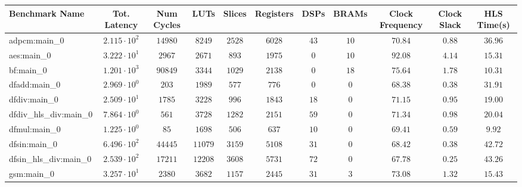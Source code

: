 \begin{tabular}{|l|c|c|c|c|c|c|c|c|c|c|}
\hline
Benchmark Name          & Tot. Latency           & Num Cycles & LUTs      & Slices    & Registers & DSPs    & BRAMs   & Clock Frequency & Clock Slack & HLS Time(s) \\
\hline
adpcm:main\_0           & $ 2.115 \cdot 10^{2} $ & $ 14980  $ & $ 8249  $ & $ 2528  $ & $ 6028  $ & $ 43  $ & $ 10  $ & $ 70.84       $ & $ 0.88    $ & $ 36.96   $ \\
aes:main\_0             & $ 3.222 \cdot 10^{1} $ & $ 2967   $ & $ 2671  $ & $ 893   $ & $ 1975  $ & $ 0   $ & $ 10  $ & $ 92.08       $ & $ 4.14    $ & $ 15.31   $ \\
bf:main\_0              & $ 1.201 \cdot 10^{3} $ & $ 90849  $ & $ 3344  $ & $ 1029  $ & $ 2138  $ & $ 0   $ & $ 18  $ & $ 75.64       $ & $ 1.78    $ & $ 10.31   $ \\
dfadd:main\_0           & $ 2.969 \cdot 10^{0} $ & $ 203    $ & $ 1989  $ & $ 577   $ & $ 776   $ & $ 0   $ & $ 0   $ & $ 68.38       $ & $ 0.38    $ & $ 31.91   $ \\
dfdiv:main\_0           & $ 2.509 \cdot 10^{1} $ & $ 1785   $ & $ 3228  $ & $ 996   $ & $ 1843  $ & $ 18  $ & $ 0   $ & $ 71.15       $ & $ 0.95    $ & $ 19.00   $ \\
dfdiv\_hls\_div:main\_0 & $ 7.864 \cdot 10^{0} $ & $ 561    $ & $ 3728  $ & $ 1282  $ & $ 2151  $ & $ 59  $ & $ 0   $ & $ 71.34       $ & $ 0.98    $ & $ 20.04   $ \\
dfmul:main\_0           & $ 1.225 \cdot 10^{0} $ & $ 85     $ & $ 1698  $ & $ 506   $ & $ 637   $ & $ 10  $ & $ 0   $ & $ 69.41       $ & $ 0.59    $ & $ 9.92    $ \\
dfsin:main\_0           & $ 6.496 \cdot 10^{2} $ & $ 44445  $ & $ 11079 $ & $ 3159  $ & $ 5108  $ & $ 31  $ & $ 0   $ & $ 68.42       $ & $ 0.38    $ & $ 42.72   $ \\
dfsin\_hls\_div:main\_0 & $ 2.539 \cdot 10^{2} $ & $ 17211  $ & $ 12208 $ & $ 3608  $ & $ 5731  $ & $ 72  $ & $ 0   $ & $ 67.78       $ & $ 0.25    $ & $ 43.26   $ \\
gsm:main\_0             & $ 3.257 \cdot 10^{1} $ & $ 2380   $ & $ 3682  $ & $ 1157  $ & $ 2445  $ & $ 31  $ & $ 3   $ & $ 73.08       $ & $ 1.32    $ & $ 15.43   $ \\

\end{tabular}
